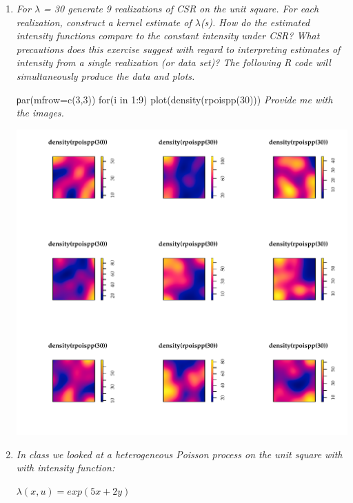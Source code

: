 \documentclass{article}\usepackage[]{graphicx}\usepackage[]{color}
\makeatletter
\def\maxwidth{ %
  \ifdim\Gin@nat@width>\linewidth
    \linewidth
  \else
    \Gin@nat@width
  \fi
}
\newenvironment{knitrout}{}{} %
\makeatother
\begin{document}
\begin{enumerate}
\item %
{\it For $\lambda$ = 30 generate 9 realizations of CSR on the unit square. For each realization, construct a kernel estimate of $\lambda$(s). How do the estimated intensity functions compare to the constant intensity under CSR? What precautions does this exercise suggest with regard to interpreting estimates of intensity from a single realization (or data set)? The following R code will simultaneously produce the data and plots.}

{\texttt par(mfrow=c(3,3))
  for(i in 1:9) plot(density(rpoispp(30)))}
{\it Provide me with the images.}

\begin{knitrout}\footnotesize
{}\color{fgcolor}

{\centering \includegraphics[width=\maxwidth]{figure/prob1-1} 

}



\end{knitrout}

\item %
{\it In class we looked at a heterogeneous Poisson process on the unit square with with intensity function:}

\begin{center}
$\lambda(x,u) = exp(5x + 2y)$
\end{center}


\end{enumerate}
\end{document}
